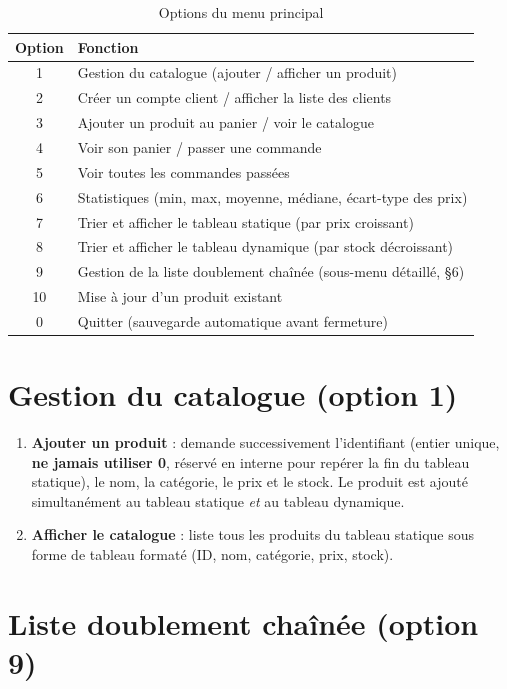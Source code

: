 \documentclass[11pt,a4paper]{article}
\begin{document}
\begin{table}[h]
\centering
\begin{tabular}{cl}
\toprule
Option & Fonction \\
\midrule
1  & Gestion du catalogue (ajouter / afficher un produit) \\
2  & Créer un compte client / afficher la liste des clients \\
3  & Ajouter un produit au panier / voir le catalogue \\
4  & Voir son panier / passer une commande \\
5  & Voir toutes les commandes passées \\
6  & Statistiques (min, max, moyenne, médiane, écart-type des prix) \\
7  & Trier et afficher le tableau statique (par prix croissant) \\
8  & Trier et afficher le tableau dynamique (par stock décroissant) \\
9  & Gestion de la liste doublement chaînée (sous-menu détaillé, §6) \\
10 & Mise à jour d'un produit existant \\
0  & Quitter (sauvegarde automatique avant fermeture) \\
\bottomrule
\end{tabular}
\caption{Options du menu principal}
\end{table}

\section{Gestion du catalogue (option 1)}

\begin{enumerate}
  \item \textbf{Ajouter un produit} : demande successivement l'identifiant
        (entier unique, \textbf{ne jamais utiliser 0}, réservé en interne
        pour repérer la fin du tableau statique), le nom, la catégorie, le
        prix et le stock. Le produit est ajouté simultanément au tableau
        statique \emph{et} au tableau dynamique.
  \item \textbf{Afficher le catalogue} : liste tous les produits du tableau
        statique sous forme de tableau formaté (ID, nom, catégorie, prix, stock).
\end{enumerate}

\section{Liste doublement chaînée (option 9)}
\end{document}
